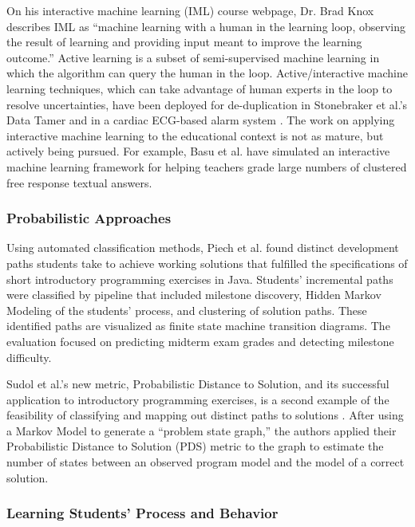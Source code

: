 On his interactive machine learning (IML) course webpage, Dr. Brad Knox describes IML as ``machine learning with a human in the learning loop, observing the result of learning and providing input meant to improve the learning outcome.'' Active learning is a subset of semi-supervised machine learning in which the algorithm can query the human in the loop. Active/interactive machine learning techniques, which can take advantage of human experts in the loop to resolve uncertainties, have been deployed for de-duplication in Stonebraker et al.'s Data Tamer \cite{stonebraker2013data} and in a cardiac ECG-based alarm system \cite{JWiensNIPS}. The work on applying interactive machine learning to the educational context is not as mature, but actively being pursued. For example, Basu et al. \cite{basupowergrading} have simulated an interactive machine learning framework for helping teachers grade large numbers of clustered free response textual answers.


\subsubsection{Probabilistic Approaches}

Using automated classification methods, Piech et al. \cite{Piech} found distinct development paths students take to achieve working solutions that fulfilled the specifications of short introductory programming exercises in Java. Students' incremental paths were classified by pipeline that included milestone discovery, Hidden Markov Modeling of the students' process, and clustering of solution paths. These identified paths are visualized as finite state machine transition diagrams. The evaluation focused on predicting midterm exam grades and detecting milestone difficulty. 

Sudol et al.'s new metric, Probabilistic Distance to Solution, and its successful application to introductory programming exercises, is a second example of the feasibility of classifying and mapping out distinct paths to solutions \cite{sudol12}. After using a Markov Model to generate a ``problem state graph,'' the authors applied their Probabilistic Distance to Solution (PDS) metric to the graph to estimate the number of states between an observed program model and the model of a correct solution.

\subsubsection{Learning Students' Process and Behavior}


